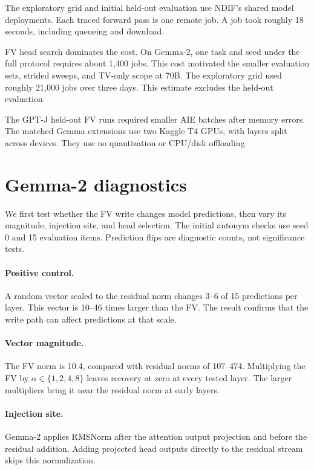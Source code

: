 \documentclass[11pt]{article}
\begin{document}
The exploratory grid and initial held-out evaluation use NDIF's shared model deployments. Each traced forward pass is one remote job. A job took roughly 18 seconds, including queueing and download.

FV head search dominates the cost. On Gemma-2, one task and seed under the full protocol requires about 1,400 jobs. This cost motivated the smaller evaluation sets, strided sweeps, and TV-only scope at 70B. The exploratory grid used roughly 21,000 jobs over three days. This estimate excludes the held-out evaluation.

The GPT-J held-out FV runs required smaller AIE batches after memory errors. The matched Gemma extensions use two Kaggle T4 GPUs, with layers split across devices. They use no quantization or CPU/disk offloading.

\section{Gemma-2 diagnostics}
\label{sec:gemma-diag}

We first test whether the FV write changes model predictions, then vary its magnitude, injection site, and head selection. The initial antonym checks use seed 0 and 15 evaluation items. Prediction flips are diagnostic counts, not significance tests.

\paragraph{Positive control.} A random vector scaled to the residual norm changes 3--6 of 15 predictions per layer. This vector is 10--46 times larger than the FV. The result confirms that the write path can affect predictions at that scale.

\paragraph{Vector magnitude.} The FV norm is 10.4, compared with residual norms of 107--474. Multiplying the FV by $\alpha\in\{1,2,4,8\}$ leaves recovery at zero at every tested layer. The larger multipliers bring it near the residual norm at early layers.

\paragraph{Injection site.} Gemma-2 applies RMSNorm after the attention output projection and before the residual addition. Adding projected head outputs directly to the residual stream skips this normalization.
\end{document}
